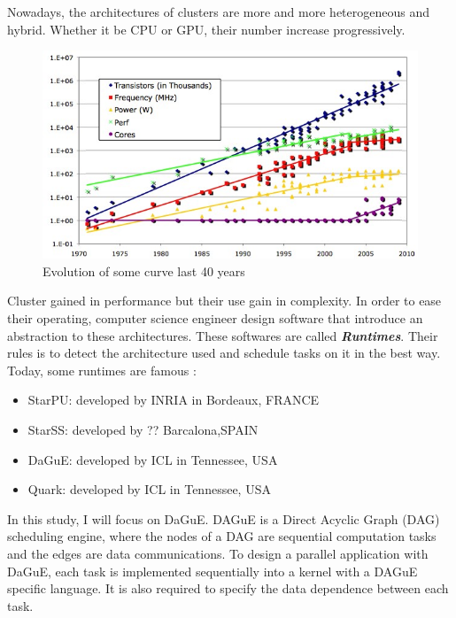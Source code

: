 \documentclass{report}
\begin{document}
Nowadays, the architectures of clusters are more and more heterogeneous and hybrid. Whether it be CPU or GPU, their number increase progressively.
\begin{figure}[!h]
\begin{center}
\includegraphics[width=\textwidth]{increase.png} 
\end{center}
\caption{Evolution of some curve last 40 years}
\end{figure}
Cluster gained in performance but their use gain in complexity. In order to ease their operating, computer science engineer design software that introduce an abstraction to these architectures. These softwares are called \textbf{\textit{Runtimes}}. Their rules is to detect the architecture used and schedule tasks on it in the best way. Today, some runtimes are famous :
\begin{itemize}
\item StarPU: developed by INRIA in Bordeaux, FRANCE
\item StarSS: developed by ?? Barcalona,SPAIN
\item DaGuE: developed by ICL in Tennessee, USA
\item Quark: developed by ICL in Tennessee, USA
\end{itemize}
In this study, I will focus on DaGuE. DAGuE is a Direct Acyclic Graph (DAG) scheduling engine, where the nodes of a DAG are sequential computation tasks and the edges are data communications. To design a parallel application with DaGuE, each task is implemented sequentially into a kernel with a DAGuE specific language. It is also required to specify the data dependence between each task.
\end{document}
